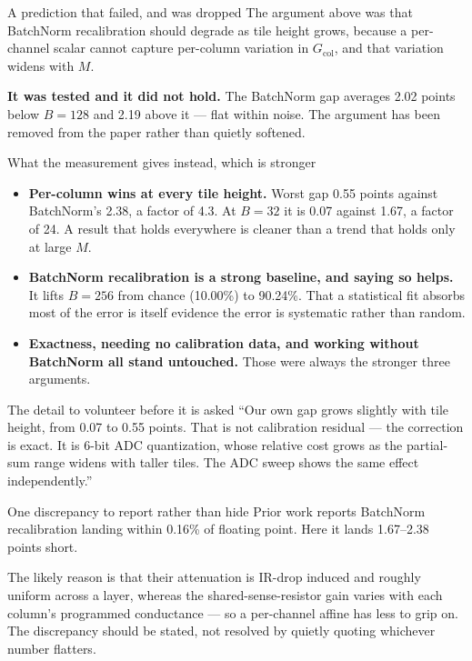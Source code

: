 \documentclass[11pt,a4paper]{report}
\newcommand{\Gcol}{G_{\mathrm{col}}}
\begin{document}
\begin{warnbox}{A prediction that failed, and was dropped}
The argument above was that BatchNorm recalibration should degrade as tile
height grows, because a per-channel scalar cannot capture per-column variation
in $\Gcol$, and that variation widens with $M$.

\textbf{It was tested and it did not hold.} The BatchNorm gap averages
2.02 points below $B{=}128$ and 2.19 above it --- flat within noise. The
argument has been removed from the paper rather than quietly softened.
\end{warnbox}

\begin{keybox}{What the measurement gives instead, which is stronger}
\begin{itemize}[leftmargin=1.3em,itemsep=2pt]
  \item \textbf{Per-column wins at every tile height.} Worst gap 0.55 points
        against BatchNorm's 2.38, a factor of 4.3. At $B{=}32$ it is 0.07
        against 1.67, a factor of 24. A result that holds everywhere is
        cleaner than a trend that holds only at large $M$.
  \item \textbf{BatchNorm recalibration is a strong baseline, and saying so
        helps.} It lifts $B{=}256$ from chance (10.00\%) to 90.24\%. That a
        statistical fit absorbs most of the error is itself evidence the error
        is systematic rather than random.
  \item \textbf{Exactness, needing no calibration data, and working without
        BatchNorm all stand untouched.} Those were always the stronger three
        arguments.
\end{itemize}
\end{keybox}

\begin{saybox}{The detail to volunteer before it is asked}
``Our own gap grows slightly with tile height, from 0.07 to 0.55 points. That
is not calibration residual --- the correction is exact. It is 6-bit ADC
quantization, whose relative cost grows as the partial-sum range widens with
taller tiles. The ADC sweep shows the same effect independently.''
\end{saybox}

\begin{warnbox}{One discrepancy to report rather than hide}
Prior work reports BatchNorm recalibration landing within 0.16\% of floating
point. Here it lands 1.67--2.38 points short.

The likely reason is that their attenuation is IR-drop induced and roughly
uniform across a layer, whereas the shared-sense-resistor gain varies with
each column's programmed conductance --- so a per-channel affine has less to
grip on. The discrepancy should be stated, not resolved by quietly quoting
whichever number flatters.
\end{warnbox}
\end{document}
